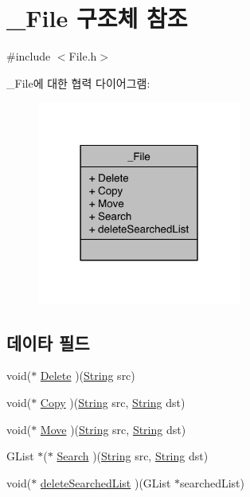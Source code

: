 \hypertarget{struct___file}{\section{\-\_\-\-File 구조체 참조}
\label{struct___file}
}


{\ttfamily \#include $<$File.\-h$>$}



\-\_\-\-File에 대한 협력 다이어그램\-:\nopagebreak
\begin{figure}[H]
\begin{center}
\leavevmode
\includegraphics[width=190pt]{d8/dc9/struct___file__coll__graph}
\end{center}
\end{figure}
\subsection*{데이타 필드}
\begin{DoxyCompactItemize}
\item 
void($\ast$ \hyperlink{struct___file_a53d84115a9c66fe30c652f908da6d3b7}{Delete} )(\hyperlink{dit_8h_a2efe6d463d80744789f228f5dc4baa39}{String} src)
\item 
void($\ast$ \hyperlink{struct___file_a92496803181c17bf9099dd7a8daf15b9}{Copy} )(\hyperlink{dit_8h_a2efe6d463d80744789f228f5dc4baa39}{String} src, \hyperlink{dit_8h_a2efe6d463d80744789f228f5dc4baa39}{String} dst)
\item 
void($\ast$ \hyperlink{struct___file_a7eb122224c5bd93834784151526da9e2}{Move} )(\hyperlink{dit_8h_a2efe6d463d80744789f228f5dc4baa39}{String} src, \hyperlink{dit_8h_a2efe6d463d80744789f228f5dc4baa39}{String} dst)
\item 
G\-List $\ast$($\ast$ \hyperlink{struct___file_a4372eaf72ad5ad415c0dc75a3420e1bb}{Search} )(\hyperlink{dit_8h_a2efe6d463d80744789f228f5dc4baa39}{String} src, \hyperlink{dit_8h_a2efe6d463d80744789f228f5dc4baa39}{String} dst)
\item 
void($\ast$ \hyperlink{struct___file_a688001b808e44b036dac30773decb791}{delete\-Searched\-List} )(G\-List $\ast$searched\-List)
\end{DoxyCompactItemize}


